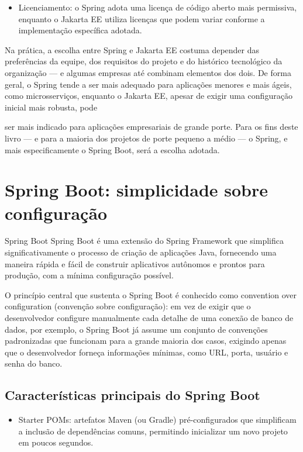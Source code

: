\begin{itemize}
  \item Licenciamento: o Spring adota uma licença de código aberto mais permissiva, enquanto o Jakarta EE utiliza licenças que podem variar conforme a implementação específica adotada.
\end{itemize}

Na prática, a escolha entre Spring e Jakarta EE costuma depender das preferências da equipe, dos requisitos do projeto e do histórico tecnológico da organização — e algumas empresas até combinam elementos dos dois. De forma geral, o Spring tende a ser mais adequado para aplicações menores e mais ágeis, como microsserviços, enquanto o Jakarta EE, apesar de exigir uma configuração inicial mais robusta, pode

ser mais indicado para aplicações empresariais de grande porte. Para os fins deste livro — e para a maioria dos projetos de porte pequeno a médio — o Spring, e mais especificamente o Spring Boot, será a escolha adotada.

\section{Spring Boot: simplicidade sobre configuração}

\begin{infobox}{Spring Boot}
Spring Boot é uma extensão do Spring Framework que simplifica significativamente o processo de criação de aplicações Java, fornecendo uma maneira rápida e fácil de construir aplicativos autônomos e prontos para produção, com a mínima configuração possível.
\end{infobox}

O princípio central que sustenta o Spring Boot é conhecido como convention over configuration (convenção sobre configuração): em vez de exigir que o desenvolvedor configure manualmente cada detalhe de uma conexão de banco de dados, por exemplo, o Spring Boot já assume um conjunto de convenções padronizadas que funcionam para a grande maioria dos casos, exigindo apenas que o desenvolvedor forneça informações mínimas, como URL, porta, usuário e senha do banco.

\subsection{Características principais do Spring Boot}

\begin{itemize}
  \item Starter POMs: artefatos Maven (ou Gradle) pré-configurados que simplificam a inclusão de dependências comuns, permitindo inicializar um novo projeto em poucos segundos.
\end{itemize}

